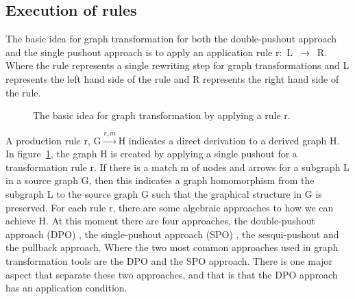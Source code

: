 \subsection{Execution of rules}
\label{sec:execute_rules}
The basic idea for graph transformation for both the double-pushout
approach and the single pushout approach is to apply an application rule
\mbox{r: L $\longrightarrow$ R}. Where the rule represents a single rewriting
step for graph transformations and L represents the left hand side of the rule and R
represents the right hand side of the rule.

\begin{figure}[H]
	\centering
	\caption[Idea of graph transformation]
	{The basic idea for graph transformation by applying a rule r.}
	\label{fig:GraphTransformationGeneral}
\end{figure}

A production rule r, \mbox{G$\xrightarrow{r,m}$H} indicates a direct
derivation to a derived graph H. In
figure~\ref{fig:GraphTransformationGeneral}, the graph H is created by
applying a single pushout for a transformation rule r. If there is a match m of
nodes and arrows for a subgraph L in a source graph G, then this indicates a
graph homomorphism from the subgraph L to the source graph G such that the
graphical structure in G is preserved. For each rule r, there are some
algebraic approaches to how we can achieve H. At this moment there are four
approaches, the double-pushout approach (DPO) \cite{Loewe1997}, the
single-pushout approach (SPO) \cite{Ehrig1997}, the
sesqui-pushout\cite{Corradini2006} and the pullback approach\cite{Bauderon}.
Where the two most common approaches used in graph transformation tools are the
DPO and the SPO approach. There is one major aspect that separate these two
approaches, and that is that the DPO approach has an application condition.

